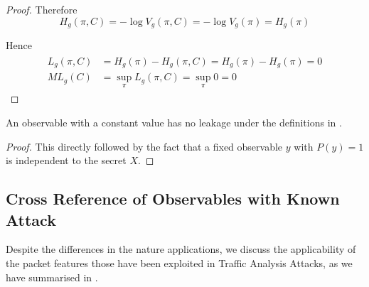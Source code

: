 \begin{proof}
	Therefore
	\begin{equation*}
		H_g(\pi, C) = -\log{V_g(\pi, C)} = -\log{V_g(\pi)} = H_g(\pi)
	\end{equation*}
	
	Hence 
	\begin{eqnarray*}
		\begin{aligned}
			L_g(\pi, C) &= H_g(\pi) - H_g(\pi,C) = H_g(\pi) - H_g(\pi) = 0\\
			ML_g(C) &= \sup_{\pi} L_g(\pi, C) = \sup_{\pi} 0 = 0
		\end{aligned}
	\end{eqnarray*}
\end{proof}

\begin{corollary} \label{Cor: Constant Leakage}
	An observable with a constant value has no leakage under the definitions in .
\end{corollary}

\begin{proof}
	This directly followed by the fact that a fixed observable $y$ with $P(y) = 1$ is independent to the secret $X$.
\end{proof}

\subsection{Cross Reference of Observables with Known Attack} \label{Subsec: Cross Reference}

Despite the differences in the nature applications, we discuss the applicability of the packet features those have been exploited in Traffic Analysis Attacks, as we have summarised in .

